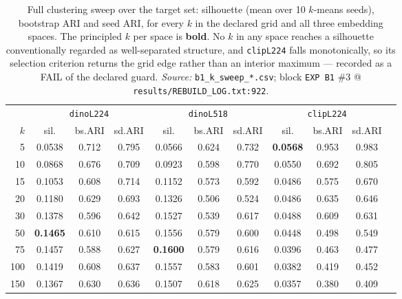 \begin{table}[h]
\caption{Full clustering sweep over the target set: silhouette (mean over 10 $k$-means seeds),
bootstrap ARI and seed ARI, for every $k$ in the declared grid and all three embedding spaces.
The principled $k$ per space is \textbf{bold}. No $k$ in any space reaches a silhouette conventionally
regarded as well-separated structure, and \texttt{clipL224} falls monotonically, so its selection
criterion returns the grid edge rather than an interior maximum --- recorded as a FAIL of the declared
guard. \emph{Source:} \texttt{b1\_k\_sweep\_*.csv};
block \texttt{EXP B1} \#3 @ \texttt{results/REBUILD\_LOG.txt:922}.}
\label{tab:silhouette}
\begin{center}\small
\begin{tabular}{rcccccccccc}
\toprule
& \multicolumn{3}{c}{\texttt{dinoL224}} & \multicolumn{3}{c}{\texttt{dinoL518}} & \multicolumn{3}{c}{\texttt{clipL224}} \\
\cmidrule(lr){2-4}\cmidrule(lr){5-7}\cmidrule(lr){8-10}
$k$ & sil. & bs.ARI & sd.ARI & sil. & bs.ARI & sd.ARI & sil. & bs.ARI & sd.ARI \\
\midrule
5 & 0.0538 & 0.712 & 0.795 & 0.0566 & 0.624 & 0.732 & \textbf{0.0568} & 0.953 & 0.983 \\
10 & 0.0868 & 0.676 & 0.709 & 0.0923 & 0.598 & 0.770 & 0.0550 & 0.692 & 0.805 \\
15 & 0.1053 & 0.608 & 0.714 & 0.1152 & 0.573 & 0.592 & 0.0486 & 0.575 & 0.670 \\
20 & 0.1180 & 0.629 & 0.693 & 0.1326 & 0.506 & 0.524 & 0.0486 & 0.635 & 0.646 \\
30 & 0.1378 & 0.596 & 0.642 & 0.1527 & 0.539 & 0.617 & 0.0488 & 0.609 & 0.631 \\
50 & \textbf{0.1465} & 0.610 & 0.615 & 0.1556 & 0.579 & 0.600 & 0.0448 & 0.498 & 0.549 \\
75 & 0.1457 & 0.588 & 0.627 & \textbf{0.1600} & 0.579 & 0.616 & 0.0396 & 0.463 & 0.477 \\
100 & 0.1419 & 0.608 & 0.637 & 0.1557 & 0.583 & 0.601 & 0.0382 & 0.419 & 0.452 \\
150 & 0.1367 & 0.630 & 0.636 & 0.1507 & 0.618 & 0.625 & 0.0357 & 0.380 & 0.409 \\
\bottomrule
\end{tabular}
\end{center}
\end{table}

